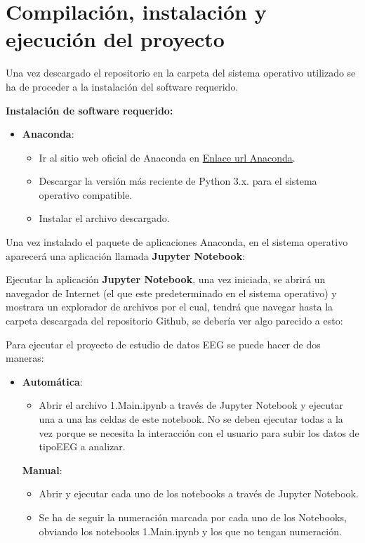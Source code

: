 \section{Compilación, instalación y ejecución del proyecto}


Una vez descargado el repositorio en la carpeta del sistema operativo utilizado se ha de proceder a la instalación del software requerido. 

\textbf{Instalación de software requerido:} 
  \begin{itemize}
   \tightlist
   \item
    \textbf{Anaconda}: 
    \begin{itemize}
   \tightlist
   \item
    Ir al sitio web oficial de Anaconda en \href{https://www.anaconda.com/download/success}{Enlace url Anaconda}. 
   \item
    Descargar la versión más reciente de Python 3.x. para el sistema operativo compatible.
   \item
   Instalar el archivo descargado.
   \end{itemize}
  \end{itemize}  


Una vez instalado el paquete de aplicaciones Anaconda, en el sistema operativo aparecerá una aplicación llamada \textbf{Jupyter Notebook}:

Ejecutar la aplicación \textbf{Jupyter Notebook}, una vez iniciada, se abrirá un navegador de Internet (el que este predeterminado en el sistema operativo) y mostrara un explorador de archivos por el cual, tendrá que navegar hasta la carpeta descargada del repositorio Github, se debería ver algo parecido a esto:




Para ejecutar el proyecto de estudio de datos EEG se puede hacer de dos maneras:

  \begin{itemize}
   
   \item
    \textbf{Automática}: 
    \begin{itemize}
   
   \item
    Abrir el archivo 1.Main.ipynb a través de Jupyter Notebook y ejecutar una a una las celdas de este notebook. No se deben ejecutar todas a la vez porque se necesita la interacción con el usuario para subir los datos de tipoEEG a analizar.
   \end{itemize}

    \textbf{Manual}: 
    \begin{itemize}
   
   \item
    Abrir y ejecutar cada uno de los notebooks a través de Jupyter Notebook. 
   \item
    Se ha de seguir la numeración marcada por cada uno de los Notebooks, obviando los notebooks 1.Main.ipynb y los que no tengan numeración.
   \end{itemize}   
   
  \end{itemize}  

